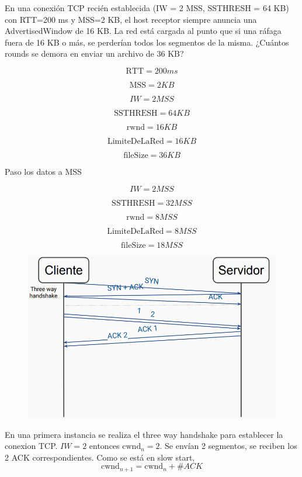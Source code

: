 
En una conexión TCP recién establecida (IW = 2 MSS, SSTHRESH = 64 KB) con RTT=200 ms y MSS=2 KB, el host receptor siempre anuncia una AdvertisedWindow de 16 KB. La red está cargada al punto que si una ráfaga fuera de 16 KB o más, se perderían todos los segmentos de la misma.
¿Cuántos rounds se demora en enviar un archivo
de 36 KB?



$$ \mathrm{RTT} = 200 ms $$

$$ \mathrm{MSS} = 2 KB$$

$$ IW = 2 MSS $$

$$ \mathrm{SSTHRESH} = 64 KB $$

$$ \mathrm{rwnd} = 16 KB $$

$$ \mathrm{LimiteDeLaRed} = 16 KB $$

$$ \mathrm{fileSize} = 36 KB $$

Paso los datos a MSS

$$ IW = 2 MSS $$

$$ \mathrm{SSTHRESH} = 32 MSS $$

$$ \mathrm{rwnd} = 8 MSS $$

$$ \mathrm{LimiteDeLaRed} = 8 MSS $$

$$ \mathrm{fileSize} = 18 MSS $$



\begin{figure}[H]
\centering
\includegraphics[width=\textwidth]{imagenes/resolucion1.png}
\end{figure}

En una primera instancia se realiza el three way handshake para establecer la conexion TCP. $IW = 2$ entonces $\mathrm{cwnd}_n = 2$. Se envían 2 segmentos, se reciben los 2 ACK correspondientes. Como se está en slow start, $$ \mathrm{cwnd}_{n+1} = \mathrm{cwnd}_n + \#ACK $$


